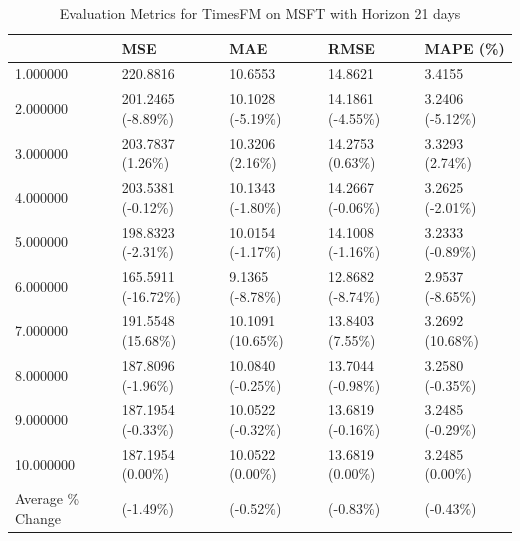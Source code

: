 \begin{table}
\caption{Evaluation Metrics for TimesFM on MSFT with Horizon 21 days}
\label{tab:fm_MSFT_h21_metrics}
\begin{tabular}{lllll}
\toprule
 & MSE & MAE & RMSE & MAPE (\%) \\
\midrule
1.000000 & 220.8816 & 10.6553 & 14.8621 & 3.4155 \\
2.000000 & 201.2465 (-8.89\%) & 10.1028 (-5.19\%) & 14.1861 (-4.55\%) & 3.2406 (-5.12\%) \\
3.000000 & 203.7837 (1.26\%) & 10.3206 (2.16\%) & 14.2753 (0.63\%) & 3.3293 (2.74\%) \\
4.000000 & 203.5381 (-0.12\%) & 10.1343 (-1.80\%) & 14.2667 (-0.06\%) & 3.2625 (-2.01\%) \\
5.000000 & 198.8323 (-2.31\%) & 10.0154 (-1.17\%) & 14.1008 (-1.16\%) & 3.2333 (-0.89\%) \\
6.000000 & 165.5911 (-16.72\%) & 9.1365 (-8.78\%) & 12.8682 (-8.74\%) & 2.9537 (-8.65\%) \\
7.000000 & 191.5548 (15.68\%) & 10.1091 (10.65\%) & 13.8403 (7.55\%) & 3.2692 (10.68\%) \\
8.000000 & 187.8096 (-1.96\%) & 10.0840 (-0.25\%) & 13.7044 (-0.98\%) & 3.2580 (-0.35\%) \\
9.000000 & 187.1954 (-0.33\%) & 10.0522 (-0.32\%) & 13.6819 (-0.16\%) & 3.2485 (-0.29\%) \\
10.000000 & 187.1954 (0.00\%) & 10.0522 (0.00\%) & 13.6819 (0.00\%) & 3.2485 (0.00\%) \\
Average \% Change & (-1.49\%) & (-0.52\%) & (-0.83\%) & (-0.43\%) \\
\bottomrule
\end{tabular}
\end{table}
